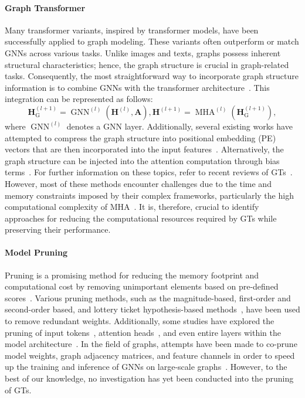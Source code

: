 \documentclass[letterpaper]{article} %
\begin{document}
\paragraph{Graph Transformer} Many transformer variants, inspired by transformer models, have been successfully applied to graph modeling. These variants often outperform or match GNNs across various tasks.  Unlike images and texts, graphs possess inherent structural characteristics; hence, the graph structure is crucial in graph-related tasks. Consequently, the most straightforward way to incorporate graph structure information is to combine GNNs with the transformer architecture~\cite{grover,graphtrans,graphgps}. This integration can be represented as follows:
\begin{equation*}
\mathbf{H}_{\text{G}}^{(l+1)}=\operatorname{GNN}^{(l)}\left(\mathbf{H}^{(l)}, \mathbf{A}\right), 
\mathbf{H}^{(l+1)}=\operatorname{MHA}^{(l)}\left(\mathbf{H}_{\text{G}}^{(l+1)}\right),
\end{equation*}
where $\operatorname{GNN}^{(l)}$ denotes a GNN layer. Additionally, several existing works have attempted to compress the graph structure into positional embedding (PE) vectors that are then incorporated into the input features~\cite{graph-transformer,san,egt}. Alternatively, the graph structure can be injected into the attention computation through bias terms~\cite{graphormer-v1}. For further information on these topics, refer to recent reviews of GTs~\cite{transformer-review}. However, most of these methods encounter challenges due to the time and memory constraints imposed by their complex frameworks, particularly the high computational complexity of MHA~\cite{ans-gt,nagphormer}. It is, therefore, crucial to identify approaches for reducing the computational resources required by GTs while preserving their performance. 


\paragraph{Model Pruning}  Pruning is a promising method for reducing the memory footprint and computational cost by removing unimportant elements based on pre-defined scores~\cite{survey-pruning}. Various pruning methods, such as the magnitude-based, first-order and second-order based, and lottery ticket hypothesis-based methods~\cite{granet,growth-set,lth}, have been used to remove redundant weights. Additionally, some studies have explored the pruning of input tokens~\cite{ltp,evit}, attention heads~\cite{head-analysis,head-sixteen}, and even entire layers within the model architecture~\cite{layer-prune,wdpruning}. In the field of graphs, attempts have been made to co-prune model weights, graph adjacency matrices, and feature channels in order to speed up the training and inference of GNNs on large-scale graphs~\cite{gebt,ugs,glt,cgp}. However, to the best of our knowledge, no investigation has yet been conducted into the pruning of GTs.
\end{document}
